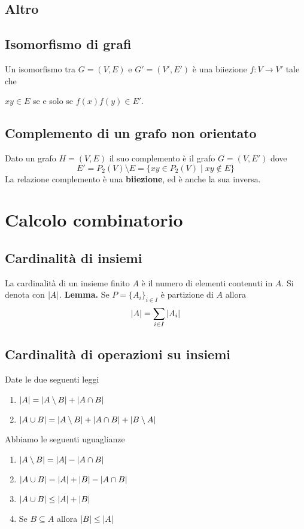 \documentclass{article}
\begin{document}
\subsection{Altro}
\subsection*{Isomorfismo di grafi}
Un isomorfismo tra \(G = (V,E)\) e \(G' = (V',E')\) è una biiezione \(f: V \rightarrow V'\) tale che
\begin{center}
    \(xy \in E\) se e solo se \(f(x)f(y) \in E'\).
\end{center}
\subsection*{Complemento di un grafo non orientato}
Dato un grafo \(H = (V,E)\) il suo complemento è il grafo \(G = (V,E')\) dove
\[E' = P_2(V) \setminus E = \{xy \in P_2(V) \mid xy \notin E\}\]
La relazione complemento è una \textbf{biiezione}, ed è anche la sua inversa.

\pagebreak

\section{Calcolo combinatorio}
\subsection{Cardinalità di insiemi}
La cardinalità di un insieme finito \(A\) è il numero di elementi contenuti in \(A\). Si denota con \(\left\lvert A \right\rvert\).
\textbf{Lemma. } Se \(P = \{A_i\}_{i \in I}\) è partizione di \(A\) allora
\[\left\lvert A \right\rvert = \sum_{i \in I} \left\lvert A_i \right\rvert\]
\subsection*{Cardinalità di operazioni su insiemi}
Date le due seguenti leggi
\begin{enumerate}
    \item \(\left\lvert A \right\rvert = \left\lvert A \setminus B \right\rvert + \left\lvert A \cap B \right\rvert\)
    \item \(\left\lvert A \cup B \right\rvert = \left\lvert A \setminus B \right\rvert + \left\lvert A \cap B \right\rvert + \left\lvert B \setminus A \right\rvert\)
\end{enumerate}
Abbiamo le seguenti uguaglianze
\begin{enumerate}
    \item \(\left\lvert A \setminus B \right\rvert = \left\lvert A \right\rvert - \left\lvert A \cap B \right\rvert\)
    \item \(\left\lvert A \cup B \right\rvert = \left\lvert A \right\rvert + \left\lvert B \right\rvert - \left\lvert A \cap B \right\rvert\)
    \item \(\left\lvert A \cup B \right\rvert \leq \left\lvert A \right\rvert + \left\lvert B \right\rvert\)
    \item Se \(B \subseteq A\) allora \(\left\lvert B \right\rvert \leq \left\lvert A \right\rvert\)
\end{enumerate}
\end{document}
